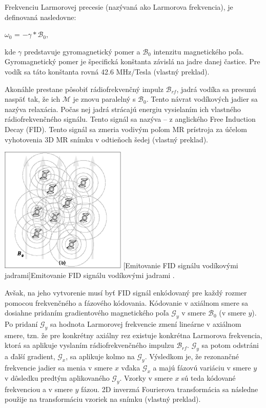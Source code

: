 Frekvenciu Larmorovej precesie (nazývaná ako Larmorova frekvencia), je definovaná nasledovne:

\begin {center}
$\omega_{0}$ = $-\gamma * \mathcal{B}_{0}$,
\end {center}

kde $\gamma$ predstavuje gyromagnetický pomer a $\mathcal{B}_{0}$ intenzitu magnetického poľa.
Gyromagnetický pomer je špecifická konštanta závislá na jadre danej častice. Pre vodík sa táto konštanta rovná 42.6 MHz/Tesla \cite{basic_principles_of_mri} (vlastný preklad). \newline

Akonáhle prestane pôsobiť rádiofrekvenčný impulz $\mathcal{B}_{rf}$, jadrá vodíka sa presunú naspäť tak, že ich $\mathcal{M}$ je znovu paralelný s $\mathcal{B}_{0}$. Tento návrat vodíkových jadier sa nazýva relaxácia. Počas nej jadrá strácajú energiu vysielaním ich vlastného rádiofrekvenčného signálu. Tento signál sa nazýva  -- z anglického Free Induction Decay (FID). Tento signál sa zmeria vodivým poľom MR prístroja za účelom vyhotovenia 3D MR snímku v odtieňoch šedej \cite{basic_principles_of_mri} (vlastný preklad).

\begin {center}
        \centering
        \includegraphics[width=6cm, height=6cm]{media/hydrogen_emitting_rf.png}
        [Emitovanie FID signálu vodíkovými jadrami]{Emitovanie FID signálu vodíkovými jadrami \cite{basic_principles_of_mri}.}
\end {center}

Avšak, na jeho vytvorenie musí byť FID signál enkódovaný pre každý rozmer pomocou frekvenčného a fázového kódovania. Kódovanie v axiálnom smere sa dosiahne pridaním gradientového magnetického poľa $\mathcal{G}_{y}$ v smere $\mathcal{B}_{0}$ (v smere $y$). Po pridaní $\mathcal{G}_{y}$ sa hodnota Larmorovej frekvencie zmení lineárne v axiálnom smere, tzn. že pre konkrétny axiálny rez existuje konkrétna Larmorova frekvencia, ktorá sa aplikuje vyslaním rádiofrekvenčného impulzu $\mathcal{B}_{rf}$. $\mathcal{G}_{y}$ sa potom odstráni a ďalší gradient, $\mathcal{G}_{x}$, sa aplikuje kolmo na $\mathcal{G}_{y}$. Výsledkom je, že rezonančné frekvencie jadier sa menia v smere $x$ vďaka $\mathcal{G}_{x}$ a majú fázovú variáciu v smere $y$ v dôsledku predtým aplikovaného $\mathcal{G}_{y}$. Vzorky v smere $x$ sú teda kódované frekvenciou a v smere $y$ fázou. 2D inverzná Fourierova transformácia sa následne použije na transformáciu vzoriek na snímku \cite{basic_principles_of_mri} (vlastný preklad). \newline

